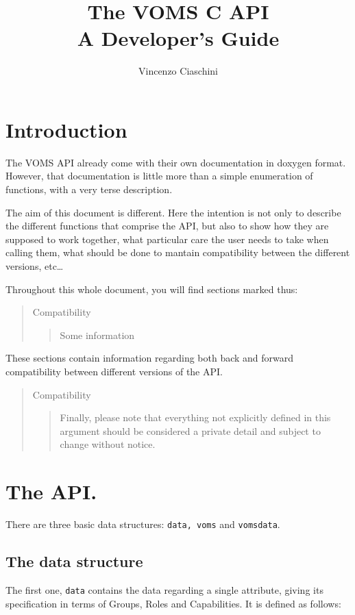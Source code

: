 \documentclass[a4paper]{book}
\newenvironment{compatibility}{\begin{quote}\color{red}Compatibility\begin{quote}}{\end{quote}\color{black}\end{quote}}
\begin{document}
\lstset{language=C}
\begin{titlepage}
\title{The VOMS C API\\ A Developer's Guide}
\author{Vincenzo Ciaschini}
\end{titlepage}
\maketitle
\tableofcontents
\newpage
\chapter{Introduction}
The VOMS API already come with their own documentation in doxygen
format.  However, that documentation is little more than a simple
enumeration of functions, with a very terse description.

The aim of this document is different.  Here the intention is not only
to describe the different functions that comprise the API, but also to
show how they are supposed to work together, what particular care the
user needs to take when calling them, what should be done to mantain
compatibility between the different versions, etc\ldots

Throughout this whole document, you will find sections marked thus:
\begin{compatibility}
Some information
\end{compatibility}
These sections contain information regarding both back and forward
compatibility between different versions of the API.

\begin{compatibility}
Finally, please note that everything not explicitly defined in this
argument should be considered a private detail and subject to change
without notice.
\end{compatibility}

\chapter{The API.}
There are three basic data structures: \verb|data, voms|
and \verb|vomsdata|.

\section{The data structure}
The first one, \verb|data| contains the data regarding a single
attribute, giving its specification in terms of Groups, Roles and
Capabilities. It is defined as follows:
\end{document}

